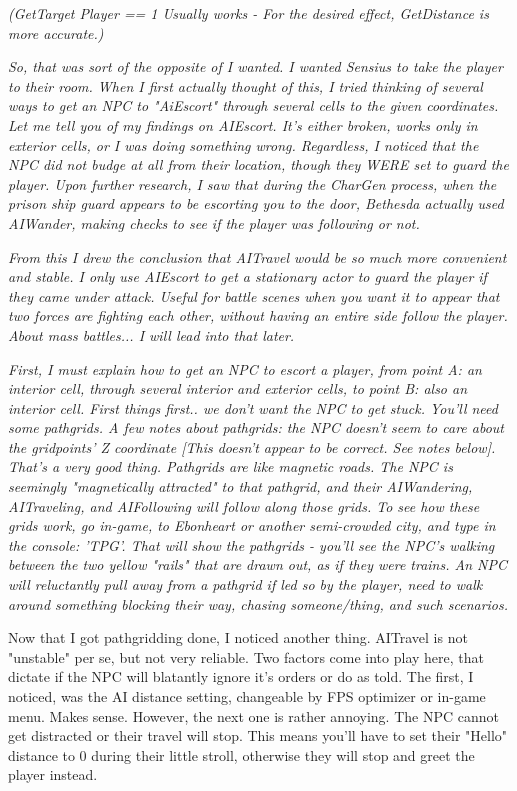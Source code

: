 \documentclass[
]{article}
\begin{document}
\emph{(GetTarget Player == 1 Usually works - For the desired effect,
GetDistance is more accurate.)}

\emph{\hfill\break
So, that was sort of the opposite of I wanted. I wanted Sensius to take
the player to their room. When I first actually thought of this, I tried
thinking of several ways to get an NPC to "AiEscort" through several
cells to the given coordinates. Let me tell you of my findings on
AIEscort. It's either broken, works only in exterior cells, or I was
doing something wrong. Regardless, I noticed that the NPC did not budge
at all from their location, though they WERE set to guard the player.
Upon further research, I saw that during the CharGen process, when the
prison ship guard appears to be escorting you to the door, Bethesda
actually used AIWander, making checks to see if the player was following
or not.}

\emph{From this I drew the conclusion that AITravel would be so much
more convenient and stable. I only use AIEscort to get a stationary
actor to guard the player if they came under attack. Useful for battle
scenes when you want it to appear that two forces are fighting each
other, without having an entire side follow the player. About mass
battles... I will lead into that later.}

\emph{\hfill\break
First, I must explain how to get an NPC to escort a player, from point
A: an interior cell, through several interior and exterior cells, to
point B: also an interior cell. First things first.. we don't want the
NPC to get stuck. You'll need some pathgrids. A few notes about
pathgrids: the NPC doesn't seem to care about the gridpoints' Z
coordinate {[}This doesn't appear to be correct. See notes below{]}.
That's a very good thing. Pathgrids are like magnetic roads. The NPC is
seemingly "magnetically attracted" to that pathgrid, and their
AIWandering, AITraveling, and AIFollowing will follow along those grids.
To see how these grids work, go in-game, to Ebonheart or another
semi-crowded city, and type in the console: 'TPG'. That will show the
pathgrids - you'll see the NPC's walking between the two yellow "rails"
that are drawn out, as if they were trains. An NPC will reluctantly pull
away from a pathgrid if led so by the player, need to walk around
something blocking their way, chasing someone/thing, and such
scenarios.}

Now that I got pathgridding done, I noticed another thing. AITravel is
not "unstable" per se, but not very reliable. Two factors come into play
here, that dictate if the NPC will blatantly ignore it's orders or do as
told. The first, I noticed, was the AI distance setting, changeable by
FPS optimizer or in-game menu. Makes sense. However, the next one is
rather annoying. The NPC cannot get distracted or their travel will
stop. This means you'll have to set their "Hello" distance to 0 during
their little stroll, otherwise they will stop and greet the player
instead.
\end{document}
